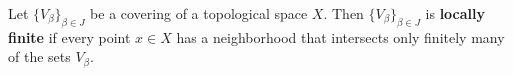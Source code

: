 Let $\{V_\beta\}_{\beta \in J}$ be a covering of a topological space $X$. Then $\{V_\beta\}_{\beta \in J}$ is \textbf{locally finite} if every point $x \in X$ has a neighborhood that intersects only finitely many of the sets $V_\beta$.
